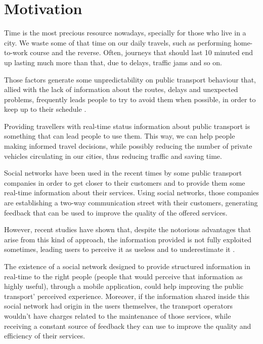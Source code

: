 \section{Motivation} \label{sec:motivation}

Time is the most precious resource nowadays, specially for those who live in a city. We waste some of that time on our daily travels, such as performing home-to-work course and the reverse. Often, journeys that should last 10 minuted end up lasting much more than that, due to delays, traffic jams and so on. 

Those factors generate some unpredictability on public transport behaviour that, allied with the lack of information about the routes, delays and unexpected problems, frequently leads people to try to avoid them when possible, in order to keep up to their schedule \cite{kn:BC07}.

Providing travellers with real-time status information about public transport is something that can lead people to use them. This way, we can help people making informed travel decisions, while possibly reducing the number of private vehicles circulating in our cities, thus reducing traffic and saving time.

Social networks have been used in the recent times by some public transport companies in order to get closer to their customers and to provide them some real-time information about their services. Using social networks, those companies are establishing a two-way communication street with their customers, generating feedback that can be used to improve the quality of the offered services.

However, recent studies have shown that, despite the notorious advantages that arise from this kind of approach, the information provided is not fully exploited sometimes, leading users to perceive it as useless and to underestimate it \cite{kn:NGeCP11}.

The existence of a social network designed to provide structured information in real-time to the right people (people that would perceive that information as highly useful), through a mobile application, could help improving the public transport' perceived experience. Moreover, if the information shared inside this social network had origin in the users themselves, the transport operators wouldn't have charges related to the maintenance of those services, while receiving a constant source of feedback they can use to improve the quality and efficiency of their services.

